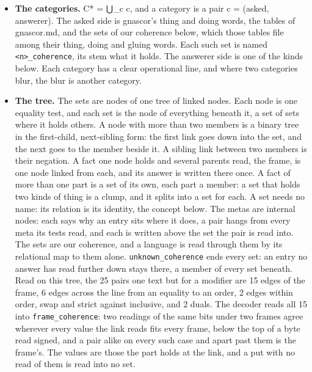 \begin{itemize}
\item \textbf{The categories.} C* = ⋃\_\allowbreak{}c c, and a category is a pair c = (asked, answerer). The asked side is gnascor's thing and doing words, the tables of gnascor.md, and the sets of our coherence below, which those tables file among their thing, doing and gluing words. Each such set is named \texttt{<n>\_\allowbreak{}coherence}, its stem what it holds. The answerer side is one of the kinds below. Each category has a clear operational line, and where two categories blur, the blur is another category.
\item \textbf{The tree.} The sets are nodes of one tree of linked nodes. Each node is one equality test, and each set is the node of everything beneath it, a set of sets where it holds others. A node with more than two members is a binary tree in the first-child, next-sibling form: the first link goes down into the set, and the next goes to the member beside it. A sibling link between two members is their negation. A fact one node holds and several parents read, the frame, is one node linked from each, and its answer is written there once. A fact of more than one part is a set of its own, each part a member: a set that holds two kinds of thing is a clump, and it splits into a set for each. A set needs no name: its relation is its identity, the concept below. The metas are internal nodes: each says why an entry sits where it does, a pair hangs from every meta its tests read, and each is written above the set the pair is read into. The sets are our coherence, and a language is read through them by its relational map to them alone. \texttt{unknown\_\allowbreak{}coherence} ends every set: an entry no answer has read further down stays there, a member of every set beneath. Read on this tree, the 25 pairs one text but for a modifier are 15 edges of the frame, 6 edges across the line from an equality to an order, 2 edges within order, swap and strict against inclusive, and 2 duals. The decoder reads all 15 into \texttt{frame\_\allowbreak{}coherence}: two readings of the same bits under two frames agree wherever every value the link reads fits every frame, below the top of a byte read signed, and a pair alike on every such case and apart past them is the frame's. The values are those the part holds at the link, and a put with no read of them is read into no set.
\end{itemize}

